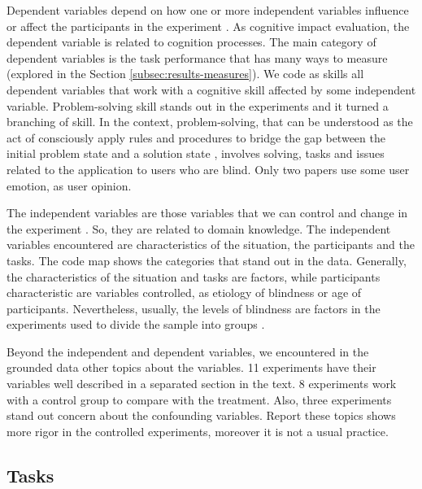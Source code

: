 Dependent variables depend on how one or more independent variables influence or affect the participants in the experiment \cite{Wohlin2000}. As cognitive impact evaluation, the dependent variable is related to cognition processes. The main category of dependent variables is the task performance that has many ways to measure (explored in the Section \ref{subsec:results-measures}). We code as skills all dependent variables that work with a cognitive skill affected by some independent variable. Problem-solving skill stands out in the experiments and it turned a branching of skill. In the context, problem-solving, that can be understood as the act of consciously apply rules and procedures to bridge the gap between the initial problem state and a solution state \cite{Glatzeder2010}, involves solving, tasks and issues related to the application to users who are blind. Only two papers use some user emotion, as user opinion.

The independent variables are those variables that we can control and change in the experiment \cite{Wohlin2000}. So, they are related to domain knowledge. The independent variables encountered are characteristics of the situation, the participants and the tasks. The code map shows the categories that stand out in the data. Generally, the characteristics of the situation and tasks are factors, while participants characteristic are variables controlled, as etiology of blindness or age of participants. Nevertheless, usually, the levels of blindness are factors in the experiments used to divide the sample into groups \cite{Lee2014,Sanchez2000}.

Beyond the independent and dependent variables, we encountered in the grounded data other topics about the variables. 11 experiments have their variables well described in a separated section in the text. 8 experiments work with a control group to compare with the treatment. Also, three experiments stand out concern about the confounding variables. Report these topics shows more rigor in the controlled experiments, moreover it is not a usual practice.

\subsection{Tasks}
\label{subsec:results-tasks}

